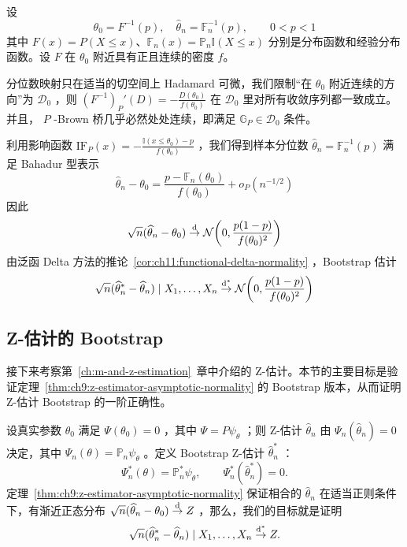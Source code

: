 \begin{example}[分位数]\label{ex:ch11:quantile}

设
\[\theta_0=F^{-1}(p),\quad \widehat\theta_n=\mathbb F_n^{-1}(p),\qquad0<p<1\]
其中 $F(x)=P(X\leq x)$、$\mathbb F_n(x)=\mathbb{P}_n\mathbb I(X\leq x)$ 分别是分布函数和经验分布函数。设 $F$ 在 $\theta_0$ 附近具有正且连续的密度 $f$。

分位数映射只在适当的切空间上 Hadamard 可微，我们限制``在 $\theta_0$ 附近连续的方向''为 $\mathscr D_0$ ，则 $(F^{-1})_{P}'(D)=-\tfrac{D(\theta_0)}{f(\theta_0)}$ 在 $\mathscr D_0$ 里对所有收敛序列都一致成立。并且， $P$ -Brown 桥几乎必然处处连续，即满足 $\mathbb G_P\in\mathscr D_0$ 条件。

利用影响函数 $\mathrm{IF}_P(x)=-\frac{\mathbb I(x\le \theta_0)-p}{f(\theta_0)}$ ，我们得到样本分位数 $\widehat{\theta}_n=\mathbb F_n^{-1}(p)$ 满足 Bahadur 型表示
\[\widehat{\theta}_n-\theta_0=\frac{p-\mathbb F_n(\theta_0)}{f(\theta_0)}+o_{P}(n^{-1/2})\]
因此
\[\sqrt{n}(\widehat{\theta}_n-\theta_0) \overset{\rm d}\to \mathcal{N}\!\left( 0, \frac{p(1-p)}{f(\theta_0)^2} \right)\]
由泛函 Delta 方法的推论~\ref{cor:ch11:functional-delta-normality} ，Bootstrap 估计
\[\sqrt n(\widehat{\theta}_n^*-\widehat{\theta}_n) \mid X_1,\ldots,X_n \overset{\rm d^*}\to \mathcal{N}\!\left( 0, \frac{p(1-p)}{f(\theta_0)^2} \right)\]



\end{example}

\subsection{Z-估计的 Bootstrap}

接下来考察第~\ref{ch:m-and-z-estimation}~章中介绍的 Z-估计。本节的主要目标是验证定理~\ref{thm:ch9:z-estimator-asymptotic-normality} 的 Bootstrap 版本，从而证明 Z-估计 Bootstrap 的一阶正确性。

设真实参数 $\theta_0$ 满足 $\Psi(\theta_0)=0$ ，其中 $\Psi=P\psi_\theta$ ；则 Z-估计 $\widehat\theta_n$ 由 $\Psi_n(\widehat\theta_n)=0$ 决定，其中 $\Psi_n(\theta)=\mathbb P_n\psi_\theta$ 。定义 Bootstrap Z-估计 $\widehat\theta_n^*$ ：
\[
\Psi_n^*(\theta)=\mathbb{P}_n^*\psi_\theta, \qquad \Psi_n^*(\widehat{\theta}_n^*)=0.
\]
定理~\ref{thm:ch9:z-estimator-asymptotic-normality} 保证相合的 $\widehat\theta_n$ 在适当正则条件下，有渐近正态分布 $\sqrt n(\widehat\theta_n-\theta_0)\overset{\rm d}\to Z$ ，那么，我们的目标就是证明
\[
\sqrt n(\widehat\theta_n^*-\widehat\theta_n)\mid X_1,\dots,X_n\overset{\rm d^*}\to Z.
\]

